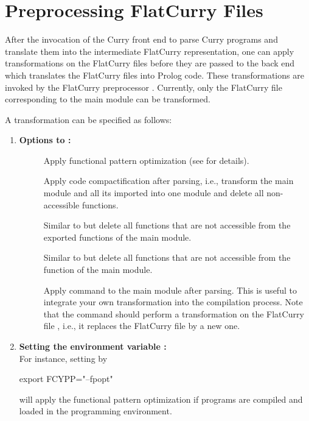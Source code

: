 \section{Preprocessing FlatCurry Files}
\label{sec-pakcspp}

After the invocation of the Curry front end to parse
Curry programs and translate them into the intermediate FlatCurry
representation, one can apply transformations on the FlatCurry files
before they are passed to the back end which translates
the FlatCurry files into Prolog code.
These transformations are invoked by the FlatCurry preprocessor
.
Currently, only the FlatCurry file corresponding to the main module
can be transformed.

A transformation can be specified as follows:
\begin{enumerate}
\item {\bf Options to :}
\begin{description}
\item[]
Apply functional pattern optimization
(see  for details).

\item[]
Apply code compactification after parsing, i.e., transform the main
module and all its imported into one module and delete all
non-accessible functions.

\item[]
Similar to  but delete all functions that are not accessible
from the exported functions of the main module.

\item[]
Similar to  but delete all functions that are not accessible
from the function  of the main module.

\item[]
Apply command  to the main module after parsing. This is useful to
integrate your own transformation into the compilation process.
Note that the command  should perform a transformation
on the FlatCurry file , i.e., it replaces the FlatCurry
file by a new one.
\end{description}

\item {\bf Setting the environment variable :}\\
For instance, setting  by
\begin{curry}
export FCYPP="--fpopt"
\end{curry}
will apply the functional pattern optimization if programs are compiled
and loaded in the \CYS programming environment.


\end{enumerate}
